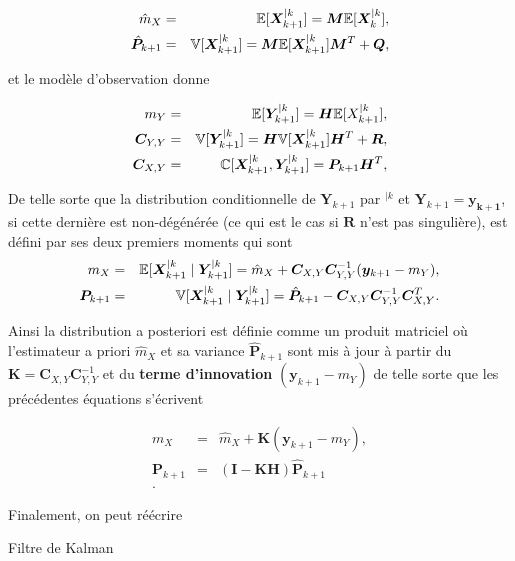 \begin{eqnarray*}
    \hat m_X &=& \mathbb{E} [\bm X_{k+1}^{\mid k}] = \bm M \mathbb{E} [\bm X_{k}^{\mid k}],\\
    \hat{\bm  P}_{k+1} &=& \mathbb{V} [\bm X_{k+1}^{\mid k}] = \bm M \mathbb{E} [\bm X_{k+1}^{\mid k}] \bm M^T + \bm Q,
\end{eqnarray*}

et le modèle d'observation donne

\begin{eqnarray*}
    m_Y &=& \mathbb{E} [\bm Y_{k+1}^{\mid k}] = \bm H \mathbb{E} [X_{k+1}^{\mid k}],\\
    \bm C_{Y,Y}&=&\mathbb{V} [\bm Y_{k+1}^{\mid k}] = \bm H \mathbb{V} [\bm X_{k+1}^{\mid k}] \bm H^T + \bm R, \\
    \bm C_{X,Y} &=& \mathbb{C}[\bm X_{k+1}^{\mid k},\bm Y^{\mid k}_{k+1}] = \bm P_{k+1} \bm H^T,
\end{eqnarray*}

De telle sorte que la distribution conditionnelle de $\bm Y_{k+1}$ par $^{\mid k}$ et $\bm Y_{k+1} = \bm{y_{k+1}}$, si cette dernière est non-dégénérée (ce qui est le cas si $\bm R$ n'est pas singulière), est défini par ses deux premiers moments qui sont
\begin{eqnarray*}
    m_X &=& \mathbb{E}[\bm X^{\mid k}_{k+1} \mid \bm Y_{k+1}^{\mid k}] = \hat m_X + \bm C_{X,Y} \bm C_{Y,Y}^{-1} (\bm y_{k+1} - m_Y), \\
    \bm P_{k+1} &=& \mathbb{V}[\bm X^{\mid k}_{k+1} \mid \bm Y_{k+1}^{\mid k}] = \hat{\bm  P}_{k+1} - \bm C_{X,Y} \bm C_{Y,Y}^{-1} \bm C_{X,Y}^T.
\end{eqnarray*}

Ainsi la distribution a posteriori est définie comme un produit matriciel où l'estimateur a priori $\hat m_X$ et sa variance $\hat{\bm  P}_{k+1}$ sont mis à jour à partir du  $\bm K = \bm C_{X,Y} \bm C_{Y,Y}^{-1} $ et du \textbf{terme d'innovation} $(\bm y_{k+1} - m_Y)$ de telle sorte que les précédentes équations s'écrivent

\begin{eqnarray*}
    m_X &=& \hat m_X + \bm K (\bm y_{k+1} - m_Y), \\
    \bm P_{k+1} &=& (\bm I - \bm K\bm H)\hat{\bm  P}_{k+1} \\.
\end{eqnarray*}

Finalement, on peut réécrire
\begin{algorithm}
    \caption{Filtre de Kalman}
\end{algorithm}

